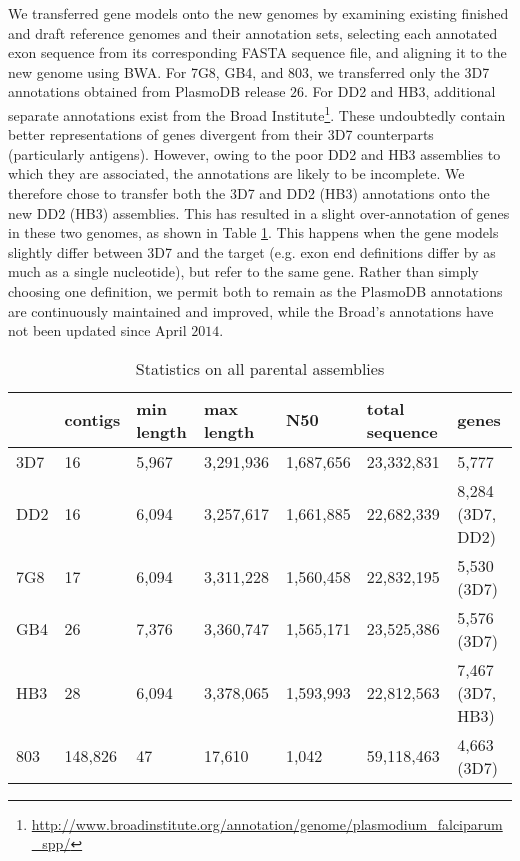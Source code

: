 We transferred gene models onto the new genomes by examining existing finished and draft reference genomes and their annotation sets, selecting each annotated exon sequence from its corresponding FASTA sequence file, and aligning it to the new genome using BWA.  For 7G8, GB4, and 803, we transferred only the 3D7 annotations obtained from PlasmoDB release $26$\cite{Aurrecoechea:2009hh}.  For DD2 and HB3, additional separate annotations exist from the Broad Institute\footnote{\url{http://www.broadinstitute.org/annotation/genome/plasmodium_falciparum_spp/}}.  These undoubtedly contain better representations of genes divergent from their 3D7 counterparts (particularly antigens).  However, owing to the poor DD2 and HB3 assemblies to which they are associated, the annotations are likely to be incomplete.  We therefore chose to transfer both the 3D7 and DD2 (HB3) annotations onto the new DD2 (HB3) assemblies.  This has resulted in a slight over-annotation of genes in these two genomes, as shown in Table \ref{tbl:refstats}.  This happens when the gene models slightly differ between 3D7 and the target (e.g. exon end definitions differ by as much as a single nucleotide), but refer to the same gene.  Rather than simply choosing one definition, we permit both to remain as the PlasmoDB annotations are continuously maintained and improved, while the Broad's annotations have not been updated since April $2014$.

\begin{table}[]
\centering
\caption{Statistics on all parental assemblies}
\label{tbl:refstats}
\begin{tabular}{@{}lllllll@{}}
\toprule
    & contigs & min length & max length & N50       & total sequence & genes            \\ \midrule
3D7 & 16      & 5,967      & 3,291,936  & 1,687,656 & 23,332,831     & 5,777            \\
DD2 & 16      & 6,094      & 3,257,617  & 1,661,885 & 22,682,339     & 8,284 (3D7, DD2) \\
7G8 & 17      & 6,094      & 3,311,228  & 1,560,458 & 22,832,195     & 5,530 (3D7)      \\
GB4 & 26      & 7,376      & 3,360,747  & 1,565,171 & 23,525,386     & 5,576 (3D7)      \\
HB3 & 28      & 6,094      & 3,378,065  & 1,593,993 & 22,812,563     & 7,467 (3D7, HB3) \\
803 & 148,826 & 47         & 17,610     & 1,042     & 59,118,463     & 4,663 (3D7)      \\ \bottomrule
\end{tabular}
\end{table}

